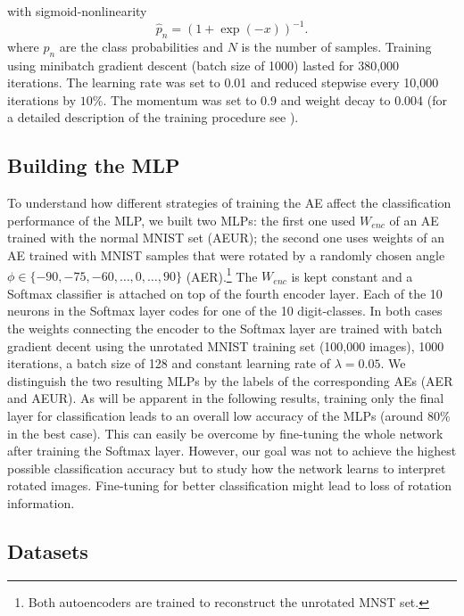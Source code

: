\documentclass[10pt,a4paper]{article}
\begin{document}
\noindent with sigmoid-nonlinearity 
		\begin{displaymath}
		\hat{p}_n  = (1 + \exp(-x))^{- 1}.
		\end{displaymath}
where $p_n$ are the class probabilities and $N$ is the number of samples.   Training using minibatch gradient descent (batch size of 1000) lasted for 380,000 iterations. The learning rate was set to 0.01 and reduced stepwise every 10,000 iterations by $10\%$.
The momentum was set to 0.9 and weight decay to 0.004 (for a detailed description of the training procedure see \cite{Oliver}).


\subsection{Building the MLP}
To understand how different strategies of training the AE affect the classification performance of the MLP, we built two MLPs: the first one used $W_{enc}$ of an AE trained with the normal MNIST set (AEUR); the second one uses weights of an AE trained with MNIST samples that were rotated by a randomly chosen angle $\phi \in \{-90, -75, -60, \dots, 0, \dots,  90\}$ (AER).\footnote{Both autoencoders are trained to reconstruct the unrotated MNST set.}
The $W_{enc}$ is kept constant and a Softmax classifier is attached on top of the fourth encoder layer. Each of the 10 neurons in the Softmax layer codes for one of the 10 digit-classes. In both cases the weights connecting the encoder to the Softmax layer are trained with batch gradient decent using the unrotated MNIST training set (100,000 images), 1000 iterations, a batch size of 128 and constant learning rate of $\lambda = 0.05$. We distinguish the two resulting MLPs by the labels of the corresponding AEs (AER and AEUR).
\newline As will be apparent in the following results, training only the final layer for classification leads to an overall low accuracy of the MLPs (around 80\% in the best case). This can easily be overcome by fine-tuning the whole network after training the Softmax layer. However, our goal was not to achieve the highest possible classification accuracy but to study how the network learns to interpret rotated images. Fine-tuning for better classification might lead to loss of rotation information.


\subsection{Datasets}
\end{document}
